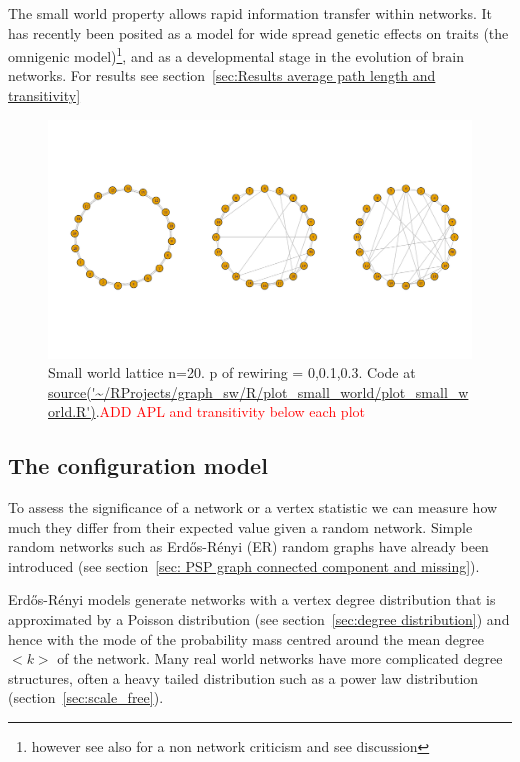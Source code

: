 The small world property allows rapid information transfer within networks. It has recently been posited as a model for wide spread genetic effects on traits (the omnigenic model)\cite{boyle2017expanded}\footnote{however see also \cite{wray2018common} for a non network criticism and see discussion}, and as a developmental stage in the evolution of brain networks\cite{vertes2015annual}. For results see section~\ref{sec:Results average path length and transitivity}




\begin{figure}
    \centering
    \includegraphics[width=\textwidth]{images/Rplot_corrected_small_world.png}
    \caption{Small world lattice n=20. p of rewiring = 0,0.1,0.3. Code at \url{source('~/RProjects/graph_sw/R/plot_small_world/plot_small_world.R')}.\textcolor{red}{ADD APL and transitivity below each plot}}
    \label{fig:small_world}
\end{figure}


 

\subsection{The configuration model}
\label{sec:configuration model}

To assess the significance of a network or a vertex statistic we can measure how much they differ from their expected value given a random network. Simple random networks such as Erd\H{o}s-R\'enyi (ER) random graphs have already been introduced (see section~\ref{sec: PSP graph connected component and missing}).

Erd\H{o}s-R\'enyi models generate networks with a vertex degree distribution that is approximated by a Poisson distribution (see section~\ref{sec:degree distribution}) and hence with the mode of the probability mass centred around the mean degree $<k>$ of the network. Many real world networks have more complicated degree structures, often a heavy tailed distribution such as a power law distribution (section~\ref{sec:scale_free}).

